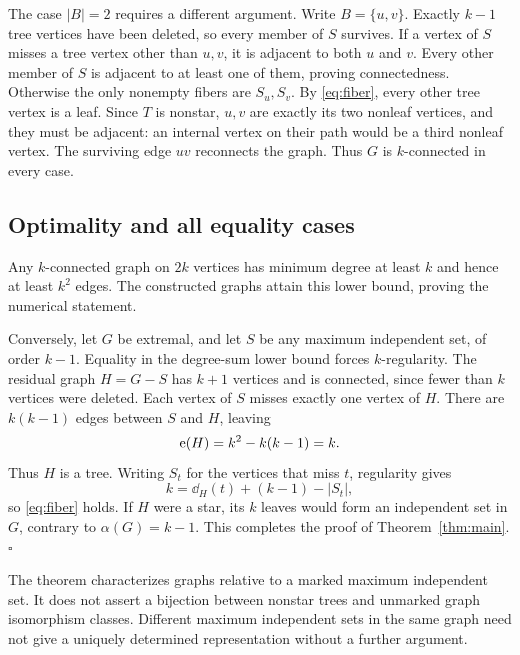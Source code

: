 The case $|B|=2$ requires a different argument.
Write $B=\{u,v\}$. Exactly $k-1$ tree vertices have been deleted, so every member of $S$ survives.
If a vertex of $S$ misses a tree vertex other than $u,v$, it is adjacent to both $u$ and $v$.
Every other member of $S$ is adjacent to at least one of them, proving connectedness.
Otherwise the only nonempty fibers are $S_u,S_v$.
By \eqref{eq:fiber}, every other tree vertex is a leaf.
Since $T$ is nonstar, $u,v$ are exactly its two nonleaf vertices, and they must be adjacent: an internal vertex on their path would be a third nonleaf vertex.
The surviving edge $uv$ reconnects the graph.
Thus $G$ is $k$-connected in every case.

\subsection{Optimality and all equality cases}

Any $k$-connected graph on $2k$ vertices has minimum degree at least $k$ and hence at least $k^2$ edges.
The constructed graphs attain this lower bound, proving the numerical statement.

Conversely, let $G$ be extremal, and let $S$ be any maximum independent set, of order $k-1$.
Equality in the degree-sum lower bound forces $k$-regularity.
The residual graph $H=G-S$ has $k+1$ vertices and is connected, since fewer than $k$ vertices were deleted.
Each vertex of $S$ misses exactly one vertex of $H$.
There are $k(k-1)$ edges between $S$ and $H$, leaving
\begin{equation}
\mathrm{e}(H)=k^2-k(k-1)=k.
\end{equation}
Thus $H$ is a tree.
Writing $S_t$ for the vertices that miss $t$, regularity gives
\begin{equation}
k=\dd_H(t)+(k-1)-|S_t|,
\end{equation}
so \eqref{eq:fiber} holds.
If $H$ were a star, its $k$ leaves would form an independent set in $G$, contrary to $\alpha(G)=k-1$.
This completes the proof of Theorem~\ref{thm:main}.\hfill$\square$

\begin{remark}
The theorem characterizes graphs relative to a marked maximum independent set.
It does not assert a bijection between nonstar trees and unmarked graph isomorphism classes.
Different maximum independent sets in the same graph need not give a uniquely determined representation without a further argument.
\end{remark}

